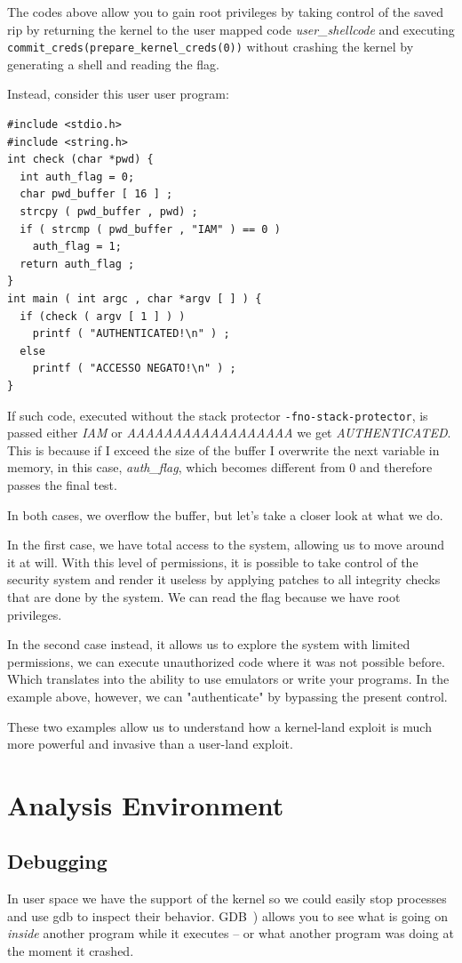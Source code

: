 \documentclass{masterthesis}
\begin{document}
The codes above allow you to gain root privileges by taking control of the saved rip by returning the kernel to the user mapped code \textit{user_shellcode} and executing \texttt{commit_creds(prepare_kernel_creds(0))} without crashing the kernel by generating a shell and reading the flag.

Instead, consider this user user program:
\begin{lstlisting}
#include <stdio.h>
#include <string.h>
int check (char *pwd) {
  int auth_flag = 0;
  char pwd_buffer [ 16 ] ;
  strcpy ( pwd_buffer , pwd) ;
  if ( strcmp ( pwd_buffer , "IAM" ) == 0 )
    auth_flag = 1;
  return auth_flag ;
}
int main ( int argc , char *argv [ ] ) {
  if (check ( argv [ 1 ] ) )
    printf ( "AUTHENTICATED!\n" ) ;
  else
    printf ( "ACCESSO NEGATO!\n" ) ;
}
\end{lstlisting}
If such code, executed without the stack protector \texttt{-fno-stack-protector}, is passed either \textit{IAM} or \textit{AAAAAAAAAAAAAAAAAA} we get \textit{AUTHENTICATED}.
This is because if I exceed the size of the buffer I overwrite the next variable in memory, in this case, \textit{auth_flag}, which becomes different from 0 and therefore passes the final test.

In both cases, we overflow the buffer, but let's take a closer look at what we do.

In the first case, we have total access to the system, allowing us to move around it at will.
With this level of permissions, it is possible to take control of the security system and render it useless by applying patches to all integrity checks that are done by the system.
We can read the flag because we have root privileges.

In the second case instead, it allows us to explore the system with limited permissions, we can execute unauthorized code where it was not possible before. Which translates into the ability to use emulators or write your programs. In the example above, however, we can "authenticate" by bypassing the present control.


These two examples allow us to understand how a kernel-land exploit is much more powerful and invasive than a user-land exploit.


\chapter{Analysis Environment}
\label{ch:analyze}

\section{Debugging}
\label{sect:debugging}
In user space we have the support of the kernel so we could easily stop processes and use gdb to inspect their behavior.
GDB~\cite{stallman1988debugging}) allows you to see what is going on \emph{inside} another program while it executes -- or what another program was doing at the moment it crashed.
\end{document}
